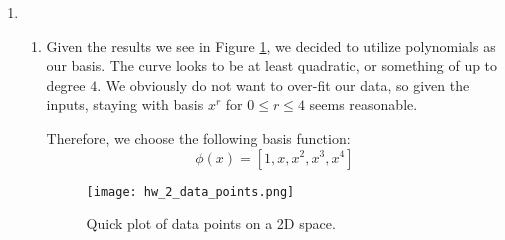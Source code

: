 \documentclass[submit]{harvardml}
\begin{document}
\begin{enumerate}
\item
\begin{enumerate}
\item Given the results we see in Figure \ref{fig:data_points}, we decided to utilize polynomials as our basis. The curve looks to be at least quadratic, or something of up to degree $4$. We obviously do not want to over-fit our data, so given the inputs, staying with basis $x^r$ for $0 \leq r \leq 4$ seems reasonable.

Therefore, we choose the following basis function:
$$
\phi(x) = [1, x, x^2, x^3, x^4]
$$
\begin{figure}[!h]
\centering
\texttt{[image: hw\_2\_data\_points.png]}
\caption{Quick plot of data points on a 2D space.}
\label{fig:data_points}
\end{figure}


\end{enumerate}
\end{enumerate}
\end{document}
